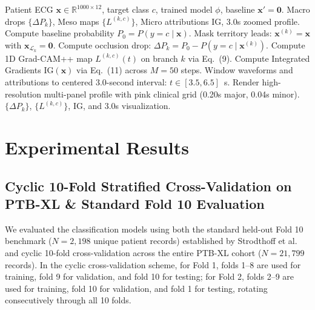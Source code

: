 \documentclass[5p,twocolumn,10pt]{elsarticle}
\begin{document}
\begin{algorithm}[!htbp]
\caption{Multi-Scale Anatomical Attribution Inference}
\label{alg:xai_inference}
\begin{algorithmic}[1]
\REQUIRE Patient ECG $\mathbf{x} \in \mathbb{R}^{1000 \times 12}$, target class $c$, trained model $\phi$, baseline $\mathbf{x}' = \mathbf{0}$.
\ENSURE Macro drops $\{\Delta P_k\}$, Meso maps $\{L^{(k, c)}\}$, Micro attributions $\text{IG}$, 3.0s zoomed profile.
\STATE Compute baseline probability $P_0 = P(y = c \mid \mathbf{x})$.
    \STATE Mask territory leads: $\mathbf{x}^{(k)} = \mathbf{x}$ with $\mathbf{x}_{\mathcal{L}_k} = \mathbf{0}$.
    \STATE Compute occlusion drop: $\Delta P_k = P_0 - P(y = c \mid \mathbf{x}^{(k)})$.
    \STATE Compute 1D Grad-CAM++ map $L^{(k, c)}(t)$ on branch $k$ via Eq.~(9).
\ENDFOR
\STATE Compute Integrated Gradients $\text{IG}(\mathbf{x})$ via Eq.~(11) across $M=50$ steps.
\STATE Window waveforms and attributions to centered 3.0-second interval: $t \in [3.5, 6.5]$~s.
\STATE Render high-resolution multi-panel profile with pink clinical grid (0.20s major, 0.04s minor).
\RETURN $\{\Delta P_k\}$, $\{L^{(k, c)}\}$, $\text{IG}$, and 3.0s visualization.
\end{algorithmic}
\end{algorithm}


\section{Experimental Results}
\label{sec:results}

\subsection{Cyclic 10-Fold Stratified Cross-Validation on PTB-XL \& Standard Fold 10 Evaluation}
\label{sec:10fold_results}
We evaluated the classification models using both the standard held-out Fold 10 benchmark ($N = 2,198$ unique patient records) established by Strodthoff et al.~\cite{strodthoff2020deep} and cyclic 10-fold cross-validation across the entire PTB-XL cohort ($N = 21,799$ records). In the cyclic cross-validation scheme, for Fold 1, folds 1--8 are used for training, fold 9 for validation, and fold 10 for testing; for Fold 2, folds 2--9 are used for training, fold 10 for validation, and fold 1 for testing, rotating consecutively through all 10 folds.
\end{document}
